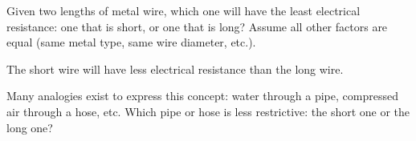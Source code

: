 

Given two lengths of metal wire, which one will have the least electrical resistance: one that is short, or one that is long?  Assume all other factors are equal (same metal type, same wire diameter, etc.).







The short wire will have less electrical resistance than the long wire.







Many analogies exist to express this concept: water through a pipe, compressed air through a hose, etc.  Which pipe or hose is less restrictive: the short one or the long one?





